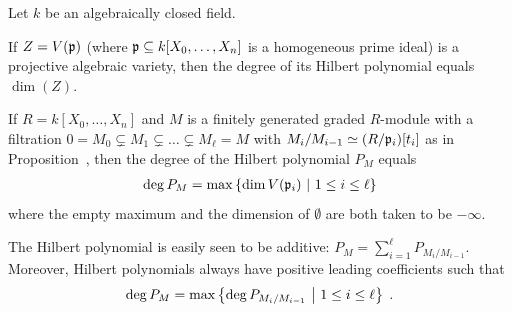 \documentclass[a4paper,parskip=half,numbers=enddot, DIV=12]{scrreprt}
\begin{document}
\begin{prop}
	Let $k$ be an algebraically closed field.
    \begin{alphanumerate}
    \item 
        If $Z=V(\mathfrak{p})$ (where $\mathfrak{p}\subseteq k[X_0,\ldots, X_n]$ is a homogeneous prime ideal) is a projective algebraic variety, then the degree of its Hilbert polynomial equals $\dim(Z)$.
    \item 
        If $R=k[X_0,\ldots, X_n]$ and $M$ is a finitely generated graded $R$-module with a filtration $0=M_0\subsetneq M_1\subsetneq\ldots\subsetneq M_\ell=M$ with $M_i/M_{i-1}\simeq (R/\mathfrak{p}_i)[t_i]$ as in Proposition~, then the degree of the Hilbert polynomial $P_M$ equals
        \begin{align*}
            \deg P_M=\max\left\{\dim V(\mathfrak{p}_i)\ \middle|\  1\leq i\leq \ell\right\}
        \end{align*}
        where the empty maximum and the dimension of $\emptyset$ are both taken to be $-\infty$.
    \end{alphanumerate}
\end{prop}
\begin{rem*}
    The Hilbert polynomial is easily seen to be additive: $P_M=\sum_{i=1}^\ell P_{M_i/M_{i-1}}$. Moreover, Hilbert polynomials always have positive leading coefficients such that 
    \begin{align*}
    	\deg P_M = \max\left\{\deg P_{M_i/M_{i-1}}\ \middle|\  1\leq i\leq \ell\right\}\;.
    \end{align*}
\end{rem*}
\end{document}

